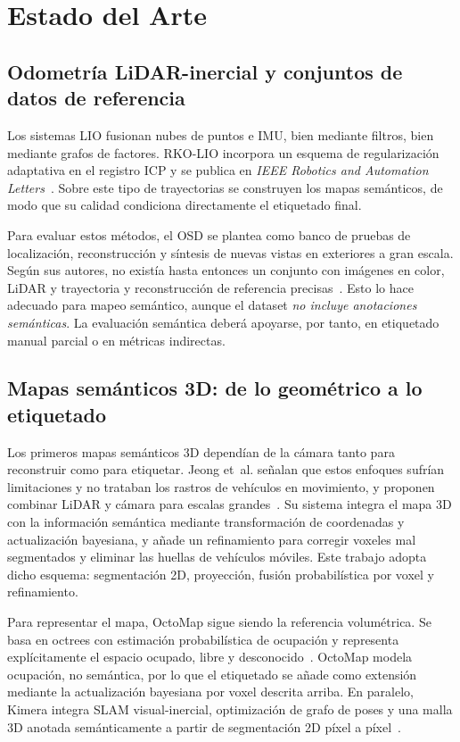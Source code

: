 \documentclass[11pt, twoside]{article}
\begin{document}
\section{Estado del Arte}
 
\subsection{Odometría LiDAR-inercial y conjuntos de datos de referencia}
 
Los sistemas LIO fusionan nubes de puntos e IMU, bien mediante filtros, bien mediante grafos de factores. RKO-LIO incorpora un esquema de regularización adaptativa en el registro ICP y se publica en \emph{IEEE Robotics and Automation Letters}~\cite{malladi2026rkolio}. Sobre este tipo de trayectorias se construyen los mapas semánticos, de modo que su calidad condiciona directamente el etiquetado final.
 
Para evaluar estos métodos, el OSD se plantea como banco de pruebas de localización, reconstrucción y síntesis de nuevas vistas en exteriores a gran escala. Según sus autores, no existía hasta entonces un conjunto con imágenes en color, LiDAR y trayectoria y reconstrucción de referencia precisas~\cite{tao2024spires}. Esto lo hace adecuado para mapeo semántico, aunque el dataset \emph{no incluye anotaciones semánticas}. La evaluación semántica deberá apoyarse, por tanto, en etiquetado manual parcial o en métricas indirectas.
 
\subsection{Mapas semánticos 3D: de lo geométrico a lo etiquetado}
 
Los primeros mapas semánticos 3D dependían de la cámara tanto para reconstruir como para etiquetar. Jeong et~al. señalan que estos enfoques sufrían limitaciones y no trataban los rastros de vehículos en movimiento, y proponen combinar LiDAR y cámara para escalas grandes~\cite{jeong2018towards}. Su sistema integra el mapa 3D con la información semántica mediante transformación de coordenadas y actualización bayesiana, y añade un refinamiento para corregir voxeles mal segmentados y eliminar las huellas de vehículos móviles. Este trabajo adopta dicho esquema: segmentación 2D, proyección, fusión probabilística por voxel y refinamiento.
 
Para representar el mapa, OctoMap sigue siendo la referencia volumétrica. Se basa en octrees con estimación probabilística de ocupación y representa explícitamente el espacio ocupado, libre y desconocido~\cite{hornung2013octomap}. OctoMap modela ocupación, no semántica, por lo que el etiquetado se añade como extensión mediante la actualización bayesiana por voxel descrita arriba. En paralelo, Kimera integra SLAM visual-inercial, optimización de grafo de poses y una malla 3D anotada semánticamente a partir de segmentación 2D píxel a píxel~\cite{rosinol2020kimera}.
 
\end{document}
